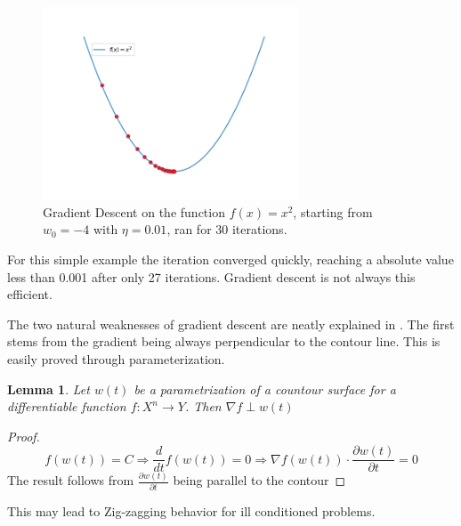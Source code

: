 \documentclass{article}
\newtheorem{lemma}[theorem]{Lemma}
\theoremstyle{definition}
\begin{document}
\begin{figure}[H]
    \centering
    \includegraphics[width=0.68\textwidth]{Project2/figures/simple_gradient_descent.png}
    \caption{Gradient Descent on the function $f(x)=x^2$, starting from $w_0 = -4$ with $\eta = 0.01$, ran for 30 iterations.}
    \label{fig:simple_gradient_descent}
\end{figure}
For this simple example the iteration converged quickly, reaching a absolute value less than 0.001 after only 27 iterations. Gradient descent is not always this efficient. 

The two natural weaknesses of gradient descent are neatly explained in \cite[p.~65--71]{MLRefined}. The first stems from the gradient being always perpendicular to the contour line. This is easily proved through parameterization.


\begin{lemma}
    Let $w(t)$ be a parametrization of a countour surface for a differentiable function $f: X^n \rightarrow Y$. Then $\nabla f \perp w(t) $ 
\end{lemma}

\begin{proof}
$$f(w(t)) = C \Rightarrow \frac{d}{dt} f(w(t)) = 0 \Rightarrow \nabla f(w(t)) \cdot \frac{\partial w(t)}{\partial t} = 0$$
The result follows from $\frac{\partial w(t)}{\partial t}$ being parallel to the contour
\end{proof}

This may lead to Zig-zagging behavior for ill conditioned problems.
\end{document}
